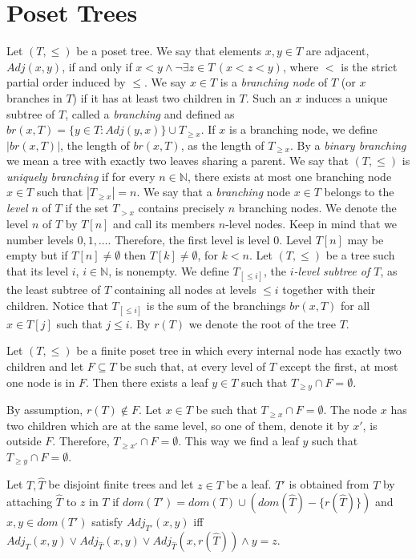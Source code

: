 \documentclass[a4paper,UKenglish,cleveref, autoref, thm-restate]{lipics-v2021}
\begin{document}
\section{Poset Trees}\label{sec:partially_ordered_trees}
Let $(T,\leq)$ be a poset tree. We say that elements $x , y \in T$ are adjacent, $Adj(x,y)$, if and only if $x < y \wedge \neg \exists z \in T \, (x < z < y)$, where $<$ is the strict partial order induced by $\leq$. We say $x \in T$ is a \emph{branching node} of $T$ (or $x$ branches in $T$) if it has at least two children in $T$. Such an $x$ induces a unique subtree of $T$, called a \emph{branching} and defined as $br(x,T) = \{y \in T: Adj(y,x) \} \cup T_{\geq x}$. If $x$ is a branching node, we define $|br(x,T)|$, the length of $br(x,T)$, as the length of $T_{\geq x}$. By a \emph{binary branching} we mean a tree with exactly two leaves sharing a parent.  
We say that $(T,\leq)$ is \emph{uniquely branching} if for every $n \in \mathbb N$, there exists at most one branching node $x \in T$ such that $|T_{\geq x}| = n$.
    We say that a \emph{branching} node $x \in T$ belongs to the \emph{level $n$} of $T$ if the set $T_{> x}$ contains precisely $n$ branching nodes. We denote the level $n$ of $T$ by $T[n]$ and call its members $n$-level nodes. Keep in mind that we number levels $0,1,\dots$. Therefore, the first level is level $0$. Level $T[n]$ may be empty but if $T[n]\neq \emptyset$ then $T[k] \neq \emptyset$, for $k < n$. 
Let $(T,\leq)$ be a tree such that its level $i$, $i \in \mathbb N$, is nonempty. We define $T_{[\leq i]}$, the \emph{$i$-level subtree of $T$}, as the least subtree of $T$ containing all nodes at levels $\leq i$ together with their children. 
Notice that $T_{[\leq i]}$ is the sum of the branchings $br(x,T)$ for all $x \in T[j]$ such that $j \leq i$.
By $r(T)$ we denote the root of the tree $T$.


\begin{lemma}\label{lemma:binary}
    Let $(T, \leq)$ be a finite poset tree in which every internal node has exactly two children and let $F \subseteq T$ be such that, at every level of $T$ except the first, at most one node is in $F$. Then there exists a leaf $y \in T$ such that $T_{\geq y} \cap F = \emptyset$. 
\end{lemma}


\begin{claimproof}
    By assumption, $r(T) \notin F$. Let $x \in T$ be such that $T_{\geq x} \cap F = \emptyset$. The node $x$ has two children which are at the same level, so one of them, denote it by $x'$, is outside $F$. Therefore, $T_{\geq x'} \cap F = \emptyset$. This way we find a leaf $y$ such that $T_{\geq y} \cap F = \emptyset$.
\end{claimproof}
    Let $T, \hat T$ be disjoint finite trees and let $z \in T$ be a leaf. $T'$ is obtained from $T$ by attaching $\hat T$ to $z$ in $T$ if $dom(T') = dom(T) \cup (dom(\hat T) - \{r(\hat T)\})$ and $x,y \in dom (T')$ satisfy $Adj_{T'}(x,y)$ iff $Adj_T(x,y) \vee Adj_{\hat T}(x,y) \vee Adj_{\hat T}(x, r(\hat T)) \wedge y = z$.
\end{document}

